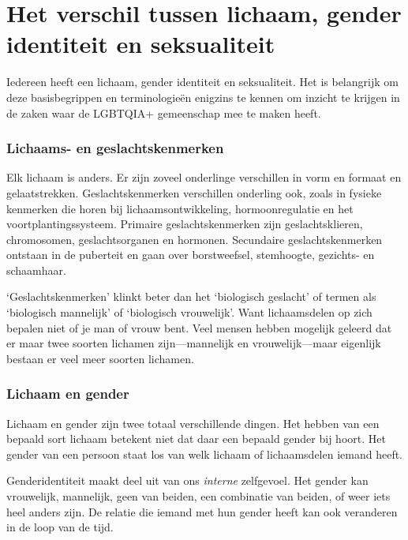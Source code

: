 \documentclass[12pt,openany]{book}
\begin{document}
\section*{Het verschil tussen lichaam, gender identiteit en seksualiteit}

Iedereen heeft een lichaam, gender identiteit en seksualiteit. Het is belangrijk om deze basisbegrippen en terminologieën enigzins te kennen om inzicht te krijgen in de zaken waar de LGBTQIA+ gemeenschap mee te maken heeft.

\subsubsection*{Lichaams- en geslachtskenmerken}

Elk lichaam is anders. Er zijn zoveel onderlinge verschillen in vorm en formaat en gelaatstrekken. Geslachtskenmerken verschillen onderling ook, zoals in fysieke kenmerken die horen bij lichaamsontwikkeling, hormoonregulatie en het voortplantingssysteem. Primaire geslachtskenmerken zijn geslachtsklieren, chromosomen, geslachtsorganen en hormonen. Secundaire geslachtskenmerken ontstaan in de puberteit en gaan over borstweefsel, stemhoogte, gezichts- en schaamhaar.

‘Geslachtskenmerken’ klinkt beter dan het ‘biologisch geslacht’ of termen als ‘biologisch mannelijk’ of ‘biologisch vrouwelijk’. Want lichaamsdelen op zich bepalen niet of je man of vrouw bent. Veel mensen hebben mogelijk geleerd dat er maar twee soorten lichamen zijn—mannelijk en vrouwelijk—maar eigenlijk bestaan er veel meer soorten lichamen.

\subsubsection*{Lichaam en gender}

Lichaam en gender zijn twee totaal verschillende dingen. Het hebben van een bepaald sort lichaam betekent niet dat daar een bepaald gender bij hoort. Het gender van een persoon staat los van welk lichaam of lichaamsdelen iemand heeft.

Genderidentiteit maakt deel uit van ons \textit{interne} zelfgevoel. Het gender kan vrouwelijk, mannelijk, geen van beiden, een combinatie van beiden, of weer iets heel anders zijn. De relatie die iemand met hun gender heeft kan ook veranderen in de loop van de tijd.
\end{document}
